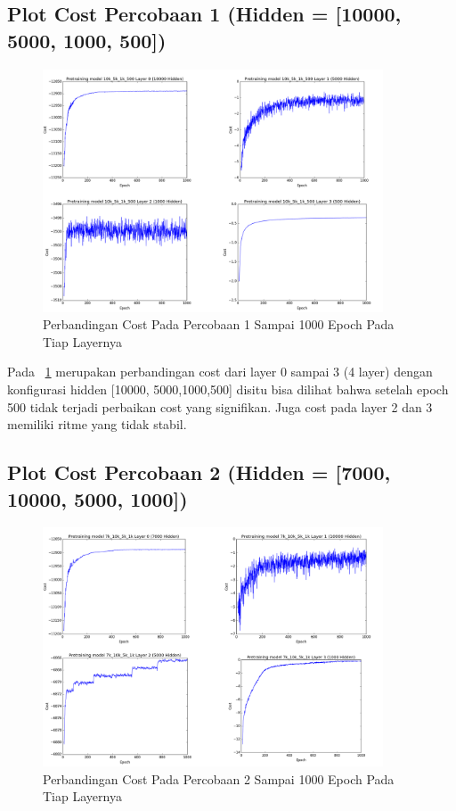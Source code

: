 \subsection{Plot Cost Percobaan 1 (Hidden = [10000, 5000, 1000, 500])}

\begin{figure}
	\centering
	\includegraphics[width=0.9\textwidth]
		{pics/percobaan_1.png}
	\caption{Perbandingan Cost Pada Percobaan 1 Sampai 1000 Epoch Pada Tiap Layernya}
	\label{fig:percobaan1}
\end{figure}

Pada \pic~\ref{fig:percobaan1} merupakan perbandingan cost dari layer 0 sampai 3 (4 layer) dengan konfigurasi hidden [10000, 5000,1000,500] disitu bisa dilihat bahwa setelah epoch 500 tidak terjadi perbaikan cost yang signifikan. Juga cost pada layer 2 dan 3 memiliki ritme yang tidak stabil.

\subsection{Plot Cost Percobaan 2 (Hidden = [7000, 10000, 5000, 1000])}
\begin{figure}
	\centering
	\includegraphics[width=0.9\textwidth]
		{pics/percobaan_2.png}
	\caption{Perbandingan Cost Pada Percobaan 2 Sampai 1000 Epoch Pada Tiap Layernya}
	\label{fig:percobaan2}
\end{figure}

